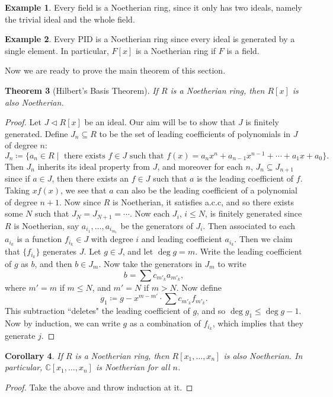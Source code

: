 \documentclass[letterpaper]{article}
\newtheorem{theorem}{Theorem}[section]
\newtheorem{corollary}[theorem]{Corollary}
\theoremstyle{definition}
\newtheorem{example}[theorem]{Example}
\theoremstyle{remark}
\newcommand\CC{\mathbb{C}}
\newcommand{\defeq}{\coloneqq}
\newcommand{\ideal}{\vartriangleleft}
\begin{document}
\begin{example}
    Every field is a Noetherian ring, since it only has two ideals, namely the trivial ideal and the whole field. 
\end{example}
\begin{example}
    Every PID is a Noetherian ring since every ideal is generated by a single element. In particular, $F[x]$ is a Noetherian ring if $F$ is a field.
\end{example}
Now we are ready to prove the main theorem of this section. \begin{theorem}[Hilbert's Basis Theorem]
    If $R$ is a Noetherian ring, then $R[x]$ is also Noetherian. 
\end{theorem}
\begin{proof}
    Let $J\ideal R[x]$ be an ideal. Our aim will be to show that $J$ is finitely generated. Define $J_n\subseteq R$ to be the set of leading coefficients of polynomials in $J$ of degree $n$: \[J_n\defeq \{a_n\in R\mid\text{ there exists }f \in J \text{ such that }f(x)= a_nx^n+a_{n-1}x^{n-1}+\cdots+a_1x+a_0\}.\] Then $J_n$ inherits its ideal property from $J$, and moreover for each $n$, $J_n\subseteq J_{n+1}$ since if $a\in J$, then there exists an $f\in J$ such that $a$ is the leading coefficient of $f$. Taking $xf(x)$, we see that $a$ can also be the leading coefficient of a polynomial of degree $n+1$. Now since $R$ is Noetherian, it satisfies a.c.c, and so there exists some $N$ such that $J_N=J_{N+1}=\cdots$. Now each $J_i$, $i\le N$, is finitely generated since $R$ is Noetherian, say $a_{i_1},\dots,a_{i_{m_1}}$ be the generators of $J_{i}$. Then associated to each $a_{i_k}$ is a function $f_{i_k}\in J$ with degree $i$ and leading coefficient $a_{i_k}$. Then we claim that $\{f_{i_k}\}$ generates $J$. Let $g\in J$, and let $\deg g=m$. Write the leading coefficient of $g$ as $b$, and then $b\in J_m$. Now take the generators in $J_m$ to write \[b=\sum c_{m'_k}a_{m'_k},\] where $m'=m$ if $m\le N$, and $m'=N$ if $m>N$. Now define \[g_1\defeq g-x^{m-m'}\cdot \sum c_{m'_k}f_{m'_k}.   \] This subtraction ``deletes" the leading coefficient of $g$, and so $\deg g_1\le \deg g-1$. Now by induction, we can write $g$ as a combination of $f_{i_k}$, which implies that they generate $j$. 
\end{proof}
\begin{corollary}\label{cor3.6}
    If $R$ is a Noetherian ring, then $R[x_1,\dots,x_n]$ is also Noetherian. In particular, $\CC[x_1,\dots,x_n]$ is Noetherian for all $n$. 
\end{corollary}
\begin{proof}
    Take the above and throw induction at it.
\end{proof}
\end{document}
